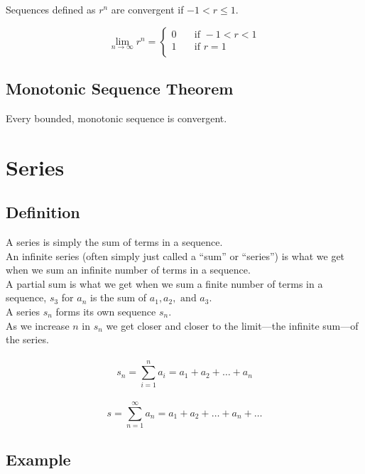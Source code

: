 \documentclass[12pt]{article}
\begin{document}
Sequences defined as ${r^n}$ are convergent if $-1 < r \leq 1$.

\[ \lim_{n\to\infty} r^n =
    \begin{cases}
        0 & \quad \text{if } -1 < r < 1\\
        1 & \quad \text{if } r = 1\\
    \end{cases}
\]


\subsection{Monotonic Sequence Theorem}

Every bounded, monotonic sequence is convergent.


\section{Series}


\subsection{Definition}

A series is simply the sum of terms in a sequence.\\
An infinite series (often simply just called a ``sum'' or ``series'') is what we get when we sum an infinite number of terms in a sequence.\\
A partial sum is what we get when we sum a finite number of terms in a sequence, $s_3$ for ${a_n}$ is the sum of $a_1, a_2,\text{ and } a_3$.\\
A series $s_n$ forms its own sequence ${s_n}$.\\
As we increase $n$ in ${s_n}$ we get closer and closer to the limit---the infinite sum---of the series.\\
\\
\begin{displaymath}
s_n = \sum_{i=1}^{n} a_i = a_1 + a_2 + \dots + a_n
\end{displaymath}
\\
\begin{displaymath}
s = \sum_{n=1}^{\infty} a_n = a_1 + a_2 + \dots + a_n + \dots
\end{displaymath}


\subsection{Example}
\end{document}
